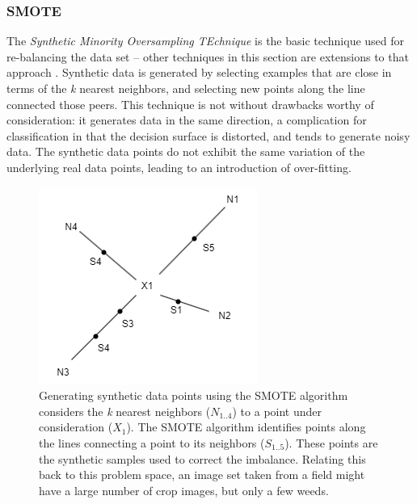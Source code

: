 \documentclass[letterpaper, notitlepage]{report}
\begin{document}
\subsubsection{SMOTE}
\label{section:smote}
The \textit{Synthetic Minority Oversampling TEchnique} is the basic technique used for re-balancing the data set -- other techniques in this section are extensions to that approach \parencite{Chawla2002-dk}. Synthetic data is generated by selecting examples that are close in terms of the \textit{k} nearest neighbors, and selecting new points along the line connected those peers. This technique is not without drawbacks worthy of consideration: it generates data in the same direction, a complication for classification in that the decision surface is distorted, and tends to generate noisy data. The synthetic data points do not exhibit the same variation of the underlying real data points, leading to an introduction of over-fitting.
\begin{figure}[H]
	\centering
	\includegraphics[scale=0.35]{./figures/smote.png}
	\caption[SMOTE selection of synthetic data points]{Generating synthetic data points using the SMOTE algorithm considers the \textit{k} nearest neighbors ($N_{1..4}$) to a point under consideration ($X_1$).  The SMOTE algorithm identifies points along the lines connecting a point to its neighbors ($S_{1..5}$). These points are the synthetic samples used to correct the imbalance. Relating this back to this problem space, an image set taken from a field might have a large number of crop images, but only a few weeds.}
	\label{fig:smote}
\end{figure}
\end{document}
